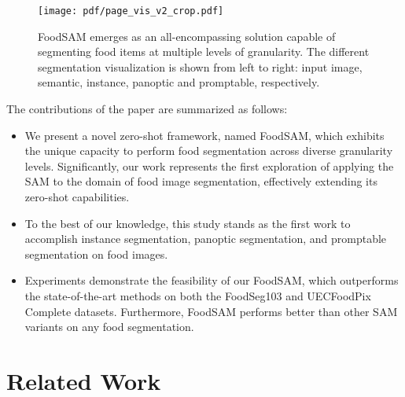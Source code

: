 \documentclass[lettersize,journal]{IEEEtran}
\begin{document}
\begin{figure*}[tbh]
\centering
\newpage
\texttt{[image: pdf/page\_vis\_v2\_crop.pdf]}
\caption{FoodSAM emerges as an all-encompassing solution capable of segmenting food items at multiple levels of granularity. The different segmentation visualization is shown from left to right: input image, semantic, instance, panoptic and promptable, respectively. 
}
\label{all seg vis}
\end{figure*}

The contributions of the paper are summarized as follows:
\begin{itemize}
    \item We present a novel zero-shot framework, named FoodSAM, which exhibits the unique capacity to perform food segmentation across diverse granularity levels.
    Significantly, our work represents the first exploration of applying the SAM to the domain of food image segmentation, effectively extending its zero-shot capabilities.
    
    \item To the best of our knowledge, this study stands as the first work to accomplish instance segmentation, panoptic segmentation, and promptable segmentation on food images.
    
    \item Experiments demonstrate the feasibility of our FoodSAM, which outperforms the state-of-the-art methods on both the FoodSeg103 and UECFoodPix Complete datasets. 
    Furthermore, FoodSAM performs better than other SAM variants on any food segmentation.
\end{itemize}


 
\section{Related Work}
\end{document}
